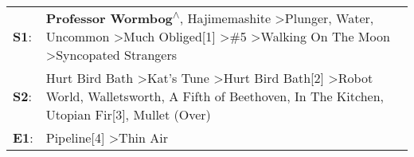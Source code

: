 \begin{supertabular}{p{0.03\textwidth}p{0.92\textwidth}}
 \textbf{S1}:  &  \textbf{Professor Wormbog\textsuperscript{$\wedge$}}, \enspace Hajimemashite\textsuperscript{} \textgreater \enspace Plunger\textsuperscript{}, \enspace Water\textsuperscript{}, \enspace Uncommon\textsuperscript{} \textgreater \enspace Much Obliged[1]\textsuperscript{} \textgreater \enspace \#5\textsuperscript{} \textgreater \enspace Walking On The Moon\textsuperscript{} \textgreater \enspace Syncopated Strangers\textsuperscript{}  \enspace  \\
 \textbf{S2}:  &                         Hurt Bird Bath\textsuperscript{} \textgreater \enspace Kat's Tune\textsuperscript{} \textgreater \enspace Hurt Bird Bath[2]\textsuperscript{} \textgreater \enspace Robot World\textsuperscript{}, \enspace Walletsworth\textsuperscript{}, \enspace A Fifth of Beethoven\textsuperscript{}, \enspace In The Kitchen\textsuperscript{}, \enspace Utopian Fir[3]\textsuperscript{}, \enspace Mullet (Over)\textsuperscript{}  \enspace  \\
 \textbf{E1}:  &                                                                                                                                                                                                                                                                                                                                                                      Pipeline[4]\textsuperscript{} \textgreater \enspace Thin Air\textsuperscript{}  \enspace  \\
\end{supertabular}
